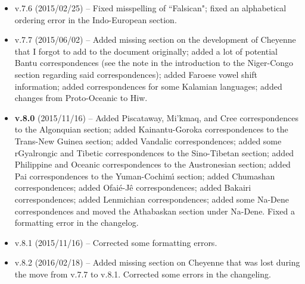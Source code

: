 \begin{itemize}
\item v.7.6 (2015/02/25) -- Fixed misspelling of ``Falsican"; fixed an alphabetical ordering 
error in the Indo-European section.
\item v.7.7 (2015/06/02) -- Added missing section on the development of Cheyenne that I forgot to add to the document originally; added a lot of potential Bantu correspondences (see the note in the introduction to the Niger-Congo section regarding said correspondences); added Faroese vowel shift information; added correspondences for some Kalamian languages; added changes from Proto-Oceanic to Hiw.
\item {\bf v.8.0} (2015/11/16) -- Added Piscataway, Mi'kmaq, and Cree correspondences to the Algonquian section; added Kainantu-Goroka correspondences to the Trans-New Guinea section; added Vandalic correspondences; added some rGyalrongic and Tibetic correspondences to the Sino-Tibetan section; added Philippine and Oceanic correspondences to the Austronesian section; added Pai correspondences to the Yuman-Cochim\'{\i} section; added Chumashan correspondences; added Ofai\'{e}-J\^{e} correspondences; added Bakairi correspondences; added Lenmichian correspondences; added some Na-Dene correspondences and moved the Athabaskan section under Na-Dene. Fixed a formatting error in the changelog.
\item v.8.1 (2015/11/16) -- Corrected some formatting errors.
\item v.8.2 (2016/02/18) -- Added missing section on Cheyenne that was lost during the move from v.7.7 to v.8.1. Corrected some errors in the changeling.
\end{itemize}
\clearpage

